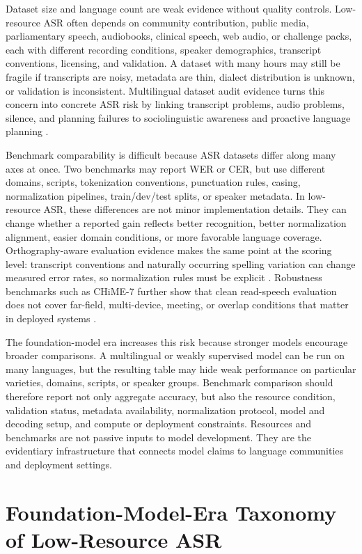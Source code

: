 \documentclass[pdflatex,sn-basic,iicol]{sn-jnl}
\theoremstyle{thmstyleone}
\theoremstyle{thmstyletwo}
\theoremstyle{thmstylethree}
\begin{document}
Dataset size and language count are weak evidence without quality controls. Low-resource ASR often depends on community contribution, public media, parliamentary speech, audiobooks, clinical speech, web audio, or challenge packs, each with different recording conditions, speaker demographics, transcript conventions, licensing, and validation. A dataset with many hours may still be fragile if transcripts are noisy, metadata are thin, dialect distribution is unknown, or validation is inconsistent. Multilingual dataset audit evidence turns this concern into concrete ASR risk by linking transcript problems, audio problems, silence, and planning failures to sociolinguistic awareness and proactive language planning \citep{lau2025_data_quality_multilingual_speech}.

Benchmark comparability is difficult because ASR datasets differ along many axes at once. Two benchmarks may report WER or CER, but use different domains, scripts, tokenization conventions, punctuation rules, casing, normalization pipelines, train/dev/test splits, or speaker metadata. In low-resource ASR, these differences are not minor implementation details. They can change whether a reported gain reflects better recognition, better normalization alignment, easier domain conditions, or more favorable language coverage. Orthography-aware evaluation evidence makes the same point at the scoring level: transcript conventions and naturally occurring spelling variation can change measured error rates, so normalization rules must be explicit \citep{karita2023lenient}. Robustness benchmarks such as CHiME-7 further show that clean read-speech evaluation does not cover far-field, multi-device, meeting, or overlap conditions that matter in deployed systems \citep{cornell2023chime7}.

The foundation-model era increases this risk because stronger models encourage broader comparisons. A multilingual or weakly supervised model can be run on many languages, but the resulting table may hide weak performance on particular varieties, domains, scripts, or speaker groups. Benchmark comparison should therefore report not only aggregate accuracy, but also the resource condition, validation status, metadata availability, normalization protocol, model and decoding setup, and compute or deployment constraints. Resources and benchmarks are not passive inputs to model development. They are the evidentiary infrastructure that connects model claims to language communities and deployment settings.

\section{Foundation-Model-Era Taxonomy of Low-Resource ASR}
\end{document}
